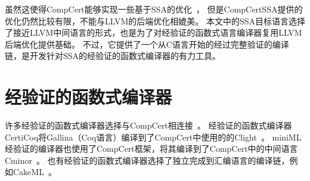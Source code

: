 虽然这使得CompCert能够实现一些基于SSA的优化~\cite{compcertssa-op,blazy-cpp2023}，
但是CompCertSSA提供的优化仍然比较有限，不能与LLVM的后端优化相媲美。
本文中的SSA目标语言选择了接近LLVM中间语言的形式，也是为了对经验证的函数式语言编译器复用LLVM后端优化提供基础。
不过，它提供了一个从C语言开始的经过完整验证的编译链，是开发针对SSA的经验证的函数式编译器的有力工具。


\section{经验证的函数式编译器} \label{sec:relatedf}

许多经验证的函数式编译器选择与CompCert相连接~\cite{belanger2019certified, dargaye2009verification}。
经验证的函数式编译器CertiCoq将Gallina（Coq语言）编译到了CompCert中使用的的Clight~\cite{belanger2019certified}。
miniML经验证的编译器也使用了CompCert框架，将其编译到了CompCert中的中间语言Cminor~\cite{dargaye2009verification}。
也有经验证的函数式编译器选择了独立完成到汇编语言的编译链，例如CakeML~\cite{cakeml2016}。

